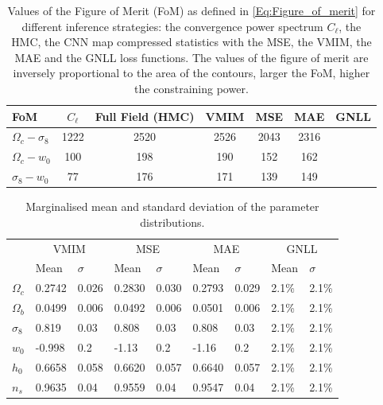 \documentclass{aa}
\begin{document}
\begin{table}
    \begin{center}
        \begin{tabular}{lcccccc} 
            \hline
            FoM & $C_{\ell}$ & Full Field (HMC)&  VMIM & MSE & MAE & GNLL   \\
            \hline\hline
            $\Omega_c-  \sigma_8$ & 1222 & 2520 & 2526 & 2043 & 2316\\
            $\Omega_c-  w_0$      & 100  & 198  & 190  & 152  & 162\\
            $\sigma_8-  w_0$      & 77   & 176  & 171  & 139  & 149\\
            \hline
        \end{tabular}
        \caption{ Values of the Figure of Merit (FoM) as defined in \autoref{Eq:Figure_of_merit} for different inference strategies: the convergence power spectrum $C_{\ell}$, the HMC, the CNN map compressed statistics with the MSE, the VMIM, the MAE and the GNLL loss functions. The values of the figure of merit are inversely proportional to the area of the contours, larger the FoM, higher the constraining power.}
        \label{tab:f_o_m}
    \end{center}
\end{table}
\begin{table}
    \begin{center}
        \begin{tabular}{|l|l|l|l|l|l|l|l|l|}
            \hline
            \multirow{2}{*}{} &
            \multicolumn{2}{c|}{VMIM} &
            \multicolumn{2}{c|}{MSE} &
            \multicolumn{2}{c|}{MAE} &
            \multicolumn{2}{c|}{GNLL} \\
            & Mean & $\sigma$ & Mean & $\sigma$ & Mean & $\sigma$  & Mean & $\sigma$ \\
            \hline
            \hline
            $\Omega_c$ & 0.2742 & 0.026 & 0.2830 & 0.030 & 0.2793 & 0.029  & 2.1\% & 2.1\%\\
            \hline
            $\Omega_b$ & 0.0499 & 0.006 & 0.0492 & 0.006 &  0.0501 & 0.006 & 2.1\% & 2.1\% \\
            \hline
            $\sigma_8$ & 0.819 & 0.03 &0.808 & 0.03 &  0.808 &0.03 & 2.1\% & 2.1\% \\
            \hline
            $w_0$      &-0.998 & 0.2 &-1.13 & 0.2 & -1.16& 0.2  & 2.1\% & 2.1\% \\
            \hline
            $h_0$      & 0.6658 & 0.058 &0.6620 & 0.057 & 0.6640 & 0.057&  2.1\% & 2.1\% \\
            \hline
            $n_s$      & 0.9635 & 0.04 & 0.9559 & 0.04 & 0.9547 & 0.04  & 2.1\% & 2.1\% \\
            \hline
        \end{tabular}
        \caption{Marginalised mean and standard deviation of the parameter distributions.}
  \end{center}
\end{table}
\end{document}
